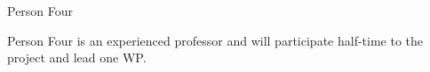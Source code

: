 \begin{participant}[type=leadPI,PM=24,gender=male,salary=5500]{Person Four}

  Person Four is an experienced professor and will participate
  half-time to the project and lead one WP.

\end{participant}

